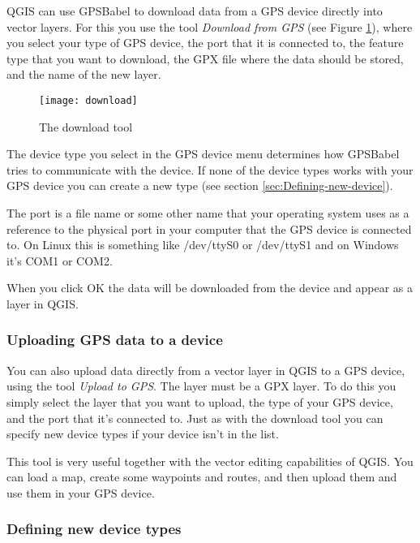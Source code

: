 QGIS can use GPSBabel to download data from a GPS device directly
into vector layers. For this you use the tool \emph{Download from
GPS} (see Figure \ref{figure_download}), where you select your type
of GPS device, the port that it is connected to, the feature type
that you want to download, the GPX file where the data should be stored,
and the name of the new layer.

\begin{figure}[ht]
   \begin{center}
\caption{\label{figure_download}The download tool}
\texttt{[image: download]}
   \end{center}
\end{figure}


The device type you select in the GPS device menu determines how GPSBabel
tries to communicate with the device. If none of the device types
works with your GPS device you can create a new type (see section
\ref{sec:Defining-new-device}).

The port is a file name or some other name that your operating system
uses as a reference to the physical port in your computer that the
GPS device is connected to. On Linux this is something like /dev/ttyS0
or /dev/ttyS1 and on Windows it's COM1 or COM2.

When you click OK the data will be downloaded from the device and
appear as a layer in QGIS.

\subsubsection{Uploading GPS data to a device}

You can also upload data directly from a vector layer in QGIS to a
GPS device, using the tool \emph{Upload to GPS}. The layer must be
a GPX layer. To do this you simply select the layer that you want
to upload, the type of your GPS device, and the port that it's connected
to. Just as with the download tool you can specify new device types
if your device isn't in the list.

This tool is very useful together with the vector editing capabilities
of QGIS. You can load a map, create some waypoints and routes, and
then upload them and use them in your GPS device.

\subsubsection{\label{sec:Defining-new-device}Defining new device types}

